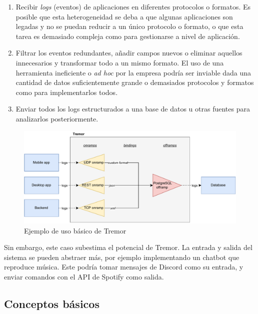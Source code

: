 \begin{enumerate}
    \item Recibir \emph{logs} (eventos) de aplicaciones en diferentes protocolos
        o formatos. Es posible que esta heterogeneidad se deba a que algunas
        aplicaciones son legadas y no se puedan reducir a un único protocolo o
        formato, o que esta tarea es demasiado compleja como para gestionarse a
        nivel de aplicación.

    \item Filtrar los eventos redundantes, añadir campos nuevos o eliminar
        aquellos innecesarios y transformar todo a un mismo formato. El uso de
        una herramienta ineficiente o \emph{ad hoc} por la empresa podría ser
        inviable dada una cantidad de datos suficientemente grande o demasiados
        protocolos y formatos como para implementarlos todos.

    \item Enviar todos los logs estructurados a una base de datos u otras
        fuentes para analizarlos posteriormente.

\end{enumerate}

\begin{figure}
    \centering
    \includegraphics[width=\textwidth]{./Imagenes/example.pdf}
    \caption{Ejemplo de uso básico de Tremor}%
    \label{fig:tremor_example}
\end{figure}

Sin embargo, este caso subestima el potencial de Tremor. La entrada y salida del
sistema se pueden abstraer más, por ejemplo implementando un chatbot que
reproduce música. Este podría tomar mensajes de Discord como su entrada, y
enviar comandos con el API de Spotify como salida.

\subsection{Conceptos básicos}

